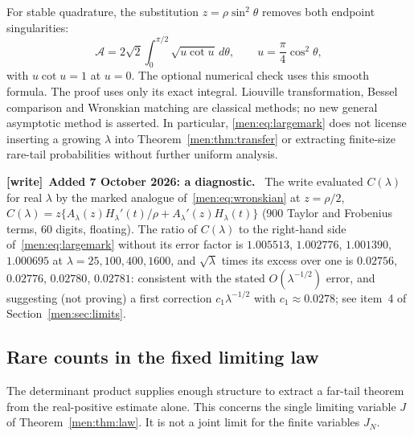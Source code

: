 \documentclass[11pt,letterpaper]{article}
\theoremstyle{remark}\newtheorem{remark}[theorem]{Remark}
\newenvironment{writenote}[1][]{\par\smallskip\begingroup\small
 \noindent\textbf{[write]}\if\relax\detokenize{#1}\relax\else~\textbf{#1.}\fi\ }%
 {\par\endgroup\smallskip}
\begin{document}
For stable quadrature, the substitution $z=\rho\sin^2\theta$ removes both endpoint singularities:
\[
 \mathcal A=2\sqrt2\int_0^{\pi/2}\sqrt{u\cot u}\,d\theta,
 \qquad u=\frac\pi4\cos^2\theta,
\]
with $u\cot u=1$ at $u=0$. The optional numerical check uses this smooth formula. The proof uses only its exact integral. Liouville transformation, Bessel comparison and Wronskian matching are classical methods; no new general asymptotic method is asserted. In particular, \eqref{men:eq:largemark} does not license inserting a growing $\lambda$ into Theorem~\ref{men:thm:transfer} or extracting finite-size rare-tail probabilities without further uniform analysis.

\begin{writenote}[Added 7 October 2026: a diagnostic]
The write evaluated $C(\lambda)$ for real $\lambda$ by the marked analogue
of~\eqref{men:eq:wronskian} at $z=\rho/2$,
$C(\lambda)=z\{A_\lambda(z)H_\lambda'(t)/\rho+A_\lambda'(z)H_\lambda(t)\}$
($900$ Taylor and Frobenius terms, 60 digits, floating). The ratio of
$C(\lambda)$ to the right-hand side of~\eqref{men:eq:largemark} without its
error factor is $1.005513$, $1.002776$, $1.001390$, $1.000695$ at
$\lambda=25,100,400,1600$, and $\sqrt\lambda$ times its excess over one is
$0.02756$, $0.02776$, $0.02780$, $0.02781$: consistent with the stated
$O(\lambda^{-1/2})$ error, and suggesting (not proving) a first correction
$c_1\lambda^{-1/2}$ with $c_1\approx0.0278$; see item~4 of
Section~\ref{men:sec:limits}.
\end{writenote}

\subsection{Rare counts in the fixed limiting law}\label{men:sec:tail}
The determinant product supplies enough structure to extract a far-tail theorem from the real-positive estimate alone. This concerns the single limiting variable $J$ of Theorem~\ref{men:thm:law}. It is not a joint limit for the finite variables $J_N$.
\end{document}
